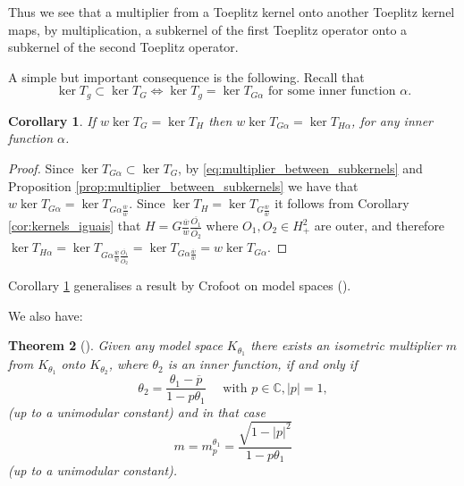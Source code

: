 \documentclass{article}
\numberwithin{equation}{section}
\theoremstyle{plain}
\newtheorem{thm}{Theorem}[section]
\newtheorem{cor}[thm]{Corollary}
\newcommand{\Hp}{\ensuremath{H^2_+}}
\newcommand{\CC}{\ensuremath{\mathbb{C}}}
\newcommand{\ol}[1]{\ensuremath{\overline{#1}}}
\newcommand{\kertg}{\ensuremath{\ker T_g}}
\begin{document}
Thus we see that a multiplier from a Toeplitz kernel onto another Toeplitz kernel maps, by multiplication, a subkernel of the first Toeplitz operator onto a subkernel of the second Toeplitz operator.

A simple but important consequence is the following.
Recall that
\begin{equation}
\kertg \subset \ker T_G \iff \kertg = \ker T_{G \alpha} \text{ for some inner function } \alpha.
\end{equation}


\begin{cor}
\label{cor:multiplier_between_subkernels_v2}
If $w \ker T_G = \ker T_H$ then $w \ker T_{G \alpha} = \ker T_{H \alpha}$, for any inner function $\alpha$.
\end{cor}


\begin{proof}
Since $\ker T_{G \alpha} \subset \ker T_G$, by \eqref{eq:multiplier_between_subkernels} and Proposition \ref{prop:multiplier_between_subkernels} we have that $w \ker T_{G \alpha} = \ker T_{G \alpha \frac{\ol w}{w}}$.
Since $\ker T_H = \ker T_{G \frac{\ol w}{w}}$ it follows from Corollary \ref{cor:kernels_iguais} that $H = G \frac{\ol w}{w} 	\frac{\ol{O_1}}{\ol{O_2}}$ where $O_1,O_2\in\Hp$ are outer, and therefore $\ker T_{H \alpha} = \ker T_{G \alpha
\frac{\ol w}{w} \frac{\ol{O_1}}{\ol{O_2}}} = \ker T_{G \alpha
\frac{\ol w}{w}} = w \ker T_{G \alpha}$.
\end{proof}


Corollary \ref{cor:multiplier_between_subkernels_v2} generalises a result by Crofoot on model spaces (\cite[Corollary 19]{Cro94}).


We also have:


\begin{thm}[{\cite[Theorem 10]{Cro94}}]
\label{thm:Crofoot_isom_multiplier}
Given any model space $K_{\theta_1}$ there exists an isometric multiplier $m$ from $K_{\theta_1}$ onto $K_{\theta_2}$, where $\theta_2$ is an inner function, if and only if
\begin{equation}
\theta_2 = \frac{\theta_1 - \ol p}{1 - p \theta_1} \quad \text{ with } p\in\CC, |p|=1,
\end{equation}
(up to a unimodular constant) and in that case
\begin{equation}
m = m_p^{\theta_1} = \frac{\sqrt{1 - |p|^2}}{1 - p \theta_1}
\end{equation}
(up to a unimodular constant).
\end{thm}
\end{document}
